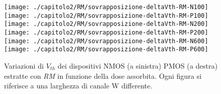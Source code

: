 \begin{figure}[H]
  \centering
  \texttt{[image: ./capitolo2/RM/sovrapposizione-deltaVth-RM-N100]}
  \texttt{[image: ./capitolo2/RM/sovrapposizione-deltaVth-RM-P100]}
  \texttt{[image: ./capitolo2/RM/sovrapposizione-deltaVth-RM-N200]}
  \texttt{[image: ./capitolo2/RM/sovrapposizione-deltaVth-RM-P200]}
  \texttt{[image: ./capitolo2/RM/sovrapposizione-deltaVth-RM-N600]}
  \texttt{[image: ./capitolo2/RM/sovrapposizione-deltaVth-RM-P600]}
  \caption[Dati $\Delta V_{th}$ estratti con RM]{Variazioni di $V_{th}$ dei dispositivi NMOS (a sinistra) PMOS (a destra) estratte con \emph{RM} in funzione della dose assorbita. Ogni figura si riferisce a una larghezza di canale W differente.}

\end{figure}